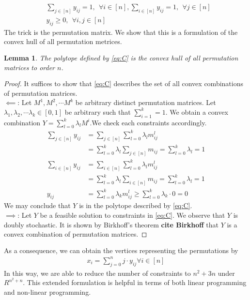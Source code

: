 \documentclass[12pt,letterpaper]{article}
\newtheorem{lemma}[theorem]{Lemma}
\begin{document}
\begin{align}
    &\sum_{j \in [n]} y_{ij} = 1, \ \ \forall i \in [n], \sum_{i \in [n]} y_{ij} = 1, \ \ \forall j \in[n] \tag{C} \\ 
    &y_{ij} \geq 0, \ \ \forall i, j \in [n] \nonumber 
\end{align}
The trick is the permutation matrix. We show that this is a formulation of the 
convex hull of all permutation metrices.
\begin{lemma}
    The polytope defined by \ref{eq:C} is the convex hull of all permutation matrices to order $n$.
\end{lemma}
\begin{proof}
    It suffices to show that \ref{eq:C} describes the set of all convex combinations of permutation matrices. \\
    $\impliedby$: Let $M^1, M^2, \cdots M^k$ be arbitrary distinct permutation matrices. Let $\lambda_1, \lambda_2, \cdots \lambda_k \in [0, 1]$ be arbitrary
    such that $\sum_{i=1}^k = 1$.
    We obtain a convex combination $Y = \sum_{l = 0}^k \lambda_l M^i$.We check each constraints accordingly. 
    \begin{align*}
    \sum_{j \in [n]} y_{ij} &= \sum_{j \in [n]} \sum_{l = 0}^k \lambda_l m_{ij}^l \\
    &= \sum_{l = 0}^k \lambda_l \sum_{j \in [n]} m_{ij} = \sum_{l = 0}^k \lambda_l = 1 \\ 
    \sum_{i \in [n]} y_{ij} &= \sum_{i \in [n]} \sum_{l = 0}^k \lambda_l m_{ij}^l \\
    &= \sum_{l = 0}^k \lambda_l \sum_{i \in [n]} m_{ij} = \sum_{l = 0}^k \lambda_l = 1 \\ 
    y_{ij} &= \sum_{l = 0}^k \lambda_k m_{ij}^l \geq \sum_{l = 0}^k \lambda_k \cdot 0  = 0 
    \end{align*}
    We may conclude that $Y$ is in the polytope described by \ref{eq:C}. \\
    $\implies$: Let $Y$ be a feasible solution to constraints in \ref{eq:C}. 
    We observe that $Y$ is doubly stochastic. It is shown by Birkhoff's theorem \textbf{cite Birkhoff} that 
    $Y$ is a convex combination of permutation matrices. 
\end{proof}

As a consequence, we can obtain the vertices representing the permutations by 
\begin{align*}
    x_i = \sum_{j = 0}^n j \cdot y_{ij} \forall i \in[n]
\end{align*}
In this way, we are able to reduce the number of constraints to $n^2 + 3n$ under $R^{n^2 + n}$.
This extended formulation is helpful in terms of both linear programming and non-linear programming. 
\end{document}
